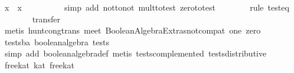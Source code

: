 \begin{isabellebody}
\ {}x\ {}\ {}x\ {}\ {}{}\isanewline
\ \ \ \ \ \ \isamarkupfalse%
\ {}simp\ add{}\ not{}to{}not\ mult{}to{}test\ zero{}to{}test{}\isanewline
\ \ \ \ \ \ \isamarkupfalse%
\ {}rule\ test{}eq{}\isanewline
\ \ \ \ \ \ \isamarkupfalse%
\ transfer\isanewline
\ \ \ \ \ \ \isamarkupfalse%
\ {}metis\ hunt{}cong{}trans\ meet\ Boolean{}Algebra{}Extras{}not{}compat\ one\ zero{}\isanewline
\ \ \isamarkupfalse%
\isanewline
{}\isamarkupfalse%
%
\endisatagproof
{\isafoldproof}%
%
\isadelimproof
\isanewline
%
\endisadelimproof
\isanewline
{}\isamarkupfalse%
\ tests{}ba{}\ {}boolean{}algebra\ tests{}\isanewline
%
\isadelimproof
\ \ %
\endisadelimproof
%
\isatagproof
{}\isamarkupfalse%
\ {}simp\ add{}\ boolean{}algebra{}def{}\ metis\ tests{}complemented\ tests{}distributive{}%
\endisatagproof
{\isafoldproof}%
%
\isadelimproof
\isanewline
%
\endisadelimproof
\isanewline
{}\isamarkupfalse%
\ free{}kat{}{}\ {}kat{}\ free{}kat{}\isanewline

\end{isabellebody}
